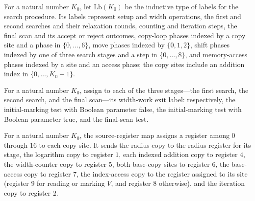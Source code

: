 \begin{definition}
\label{Complexity.LogProg.ExpBFS.Lb}
\leanok
{}
For a natural number $K_0$, let $\mathrm{Lb}(K_0)$ be the inductive type of labels for
the search procedure. Its labels represent setup and width operations, the first and
second searches and their relaxation rounds, counting and iteration steps, the final
scan and its accept or reject outcomes, copy-loop phases indexed by a copy site and a
phase in $\{0,\ldots,6\}$, move phases indexed by $\{0,1,2\}$, shift phases indexed by
one of three search stages and a step in $\{0,\ldots,8\}$, and memory-access phases
indexed by a site and an access phase; the copy sites include an addition index in
$\{0,\ldots,K_0-1\}$.
\end{definition}

\begin{definition}
\label{Complexity.LogProg.ExpBFS.wkExit}
\leanok
{}
For a natural number $K_0$, assign to each of the three stages—the first search, the
second search, and the final scan—its width-work exit label: respectively, the
initial-marking test with Boolean parameter false, the initial-marking test with Boolean
parameter true, and the final-scan test.
\end{definition}

\begin{definition}
\label{Complexity.LogProg.ExpBFS.cpSrc}
\leanok
{}
For a natural number $K_0$, the source-register map assigns a register among $0$ through
$16$ to each copy site. It sends the radius copy to the radius register for its stage,
the logarithm copy to register $1$, each indexed addition copy to register $4$, the
width-counter copy to register $5$, both base-copy sites to register $6$, the
base-access copy to register $7$, the index-access copy to the register assigned to its
site (register $9$ for reading or marking $V$, and register $8$ otherwise), and the
iteration copy to register $2$.
\end{definition}

